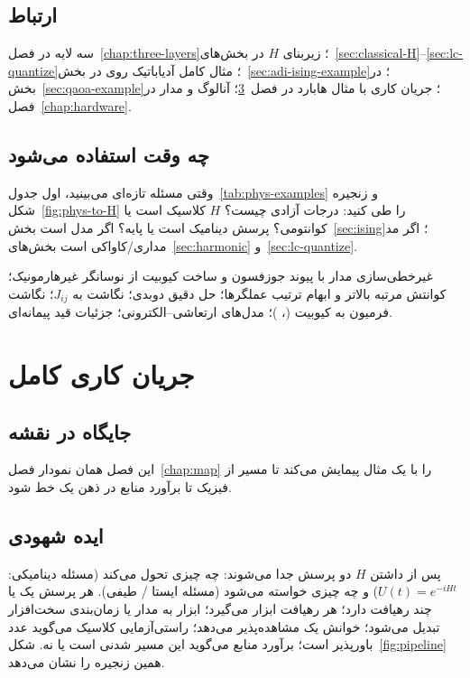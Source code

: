 \section{ارتباط}

سه لایه در فصل~\ref{chap:three-layers}؛ زیربنای $H$ در بخش‌های~\ref{sec:classical-H}--\ref{sec:lc-quantize}؛ مثال کامل آدیاباتیک روی  در بخش~\ref{sec:adi-ising-example}؛  در بخش~\ref{sec:qaoa-example}؛ جریان کاری با مثال هابارد در فصل~\ref{chap:pipeline}؛ آنالوگ و مدار در فصل~\ref{chap:hardware}.

\section{چه وقت استفاده می‌شود}

وقتی مسئله تازه‌ای می‌بینید، اول جدول~\ref{tab:phys-examples} و زنجیره شکل~\ref{fig:phys-to-H} را طی کنید: درجات آزادی چیست؟ $H$ کلاسیک است یا کوانتومی؟ پرسش دینامیک است یا پایه؟ اگر مدل  است بخش~\ref{sec:ising}؛ اگر مد مداری/کاواکی است بخش‌های~\ref{sec:harmonic} و~\ref{sec:lc-quantize}.

\begin{remark}
	غیرخطی‌سازی مدار با پیوند جوزفسون و ساخت کیوبیت از نوسانگر غیرهارمونیک؛ کوانتش مرتبه بالاتر و ابهام ترتیب عملگرها؛ حل دقیق  دوبدی؛ نگاشت  به $J_{ij}$؛ نگاشت فرمیون به کیوبیت (، )؛ مدل‌های ارتعاشی--الکترونی؛ جزئیات قید پیمانه‌ای.
\end{remark}

\chapter{جریان کاری کامل}
\label{chap:pipeline}

\section{جایگاه در نقشه}

این فصل همان نمودار فصل~\ref{chap:map} را با یک مثال پیمایش می‌کند تا مسیر از فیزیک تا برآورد منابع در ذهن یک خط شود.

\section{ایده شهودی}

پس از داشتن $H$ دو پرسش جدا می‌شوند: چه چیزی تحول می‌کند (مسئله دینامیکی: $U(t)=e^{-iHt}$) و چه چیزی خواسته می‌شود (مسئله ایستا / طیفی). هر پرسش یک یا چند رهیافت دارد؛ هر رهیافت ابزار می‌گیرد؛ ابزار به مدار یا زمان‌بندی سخت‌افزار تبدیل می‌شود؛ خوانش یک مشاهده‌پذیر می‌دهد؛ راستی‌آزمایی کلاسیک می‌گوید عدد باورپذیر است؛ برآورد منابع می‌گوید این مسیر شدنی است یا نه. شکل~\ref{fig:pipeline} همین زنجیره را نشان می‌دهد.

